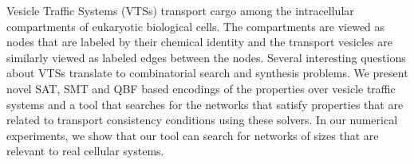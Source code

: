 Vesicle Traffic Systems (VTSs) transport cargo among the intracellular compartments of eukaryotic biological cells.
%
The compartments are viewed as nodes that are labeled by their chemical identity and the transport vesicles are similarly viewed as labeled edges between the nodes.
%
Several interesting questions about VTSs translate to combinatorial search and synthesis problems. 
%
We present novel SAT, SMT and QBF based encodings of the properties over vesicle traffic systems and a tool that searches for the networks that satisfy properties that are related to transport consistency conditions using these solvers. 
%
In our numerical experiments, we show that our tool can search for networks of sizes that are relevant to real cellular systems.



